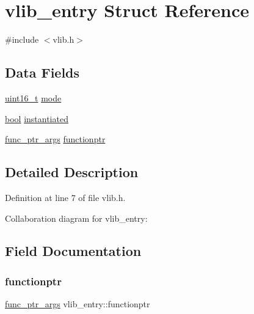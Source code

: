 \hypertarget{a00318}{}\section{vlib\+\_\+entry Struct Reference}
\label{a00318}


{\ttfamily \#include $<$vlib.\+h$>$}

\subsection*{Data Fields}
\begin{DoxyCompactItemize}
\item 
\hyperlink{a00134_a273cf69d639a59973b6019625df33e30_a273cf69d639a59973b6019625df33e30}{uint16\+\_\+t} \hyperlink{a00318_a46df5a47ac05a46ce871e5132153949c_a46df5a47ac05a46ce871e5132153949c}{mode}
\item 
\hyperlink{a00134_af6a258d8f3ee5206d682d799316314b1_af6a258d8f3ee5206d682d799316314b1}{bool} \hyperlink{a00318_ab67e2f60e6622a2d0b7c8a3ac6fd7c71_ab67e2f60e6622a2d0b7c8a3ac6fd7c71}{instantiated}
\item 
\hyperlink{a00134_ab22fa604a9d0187c6a648586ee77944f_ab22fa604a9d0187c6a648586ee77944f}{func\+\_\+ptr\+\_\+args} \hyperlink{a00318_a5d194ce83e680c074ac0a0641af42be6_a5d194ce83e680c074ac0a0641af42be6}{functionptr}
\end{DoxyCompactItemize}


\subsection{Detailed Description}


Definition at line 7 of file vlib.\+h.



Collaboration diagram for vlib\+\_\+entry\+:


\subsection{Field Documentation}
\mbox{\label{a00318_a5d194ce83e680c074ac0a0641af42be6_a5d194ce83e680c074ac0a0641af42be6}} 
\subsubsection{\texorpdfstring{functionptr}{functionptr}}
{\footnotesize\ttfamily \hyperlink{a00134_ab22fa604a9d0187c6a648586ee77944f_ab22fa604a9d0187c6a648586ee77944f}{func\+\_\+ptr\+\_\+args} vlib\+\_\+entry\+::functionptr}



